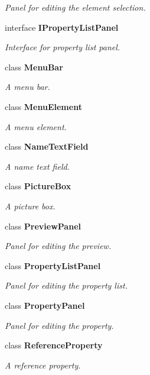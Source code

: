 \begin{DoxyCompactItemize}
\begin{DoxyCompactList}\small\item\em Panel for editing the element selection. \end{DoxyCompactList}\item 
interface {\bf I\-Property\-List\-Panel}
\begin{DoxyCompactList}\small\item\em Interface for property list panel. \end{DoxyCompactList}\item 
class {\bf Menu\-Bar}
\begin{DoxyCompactList}\small\item\em A menu bar. \end{DoxyCompactList}\item 
class {\bf Menu\-Element}
\begin{DoxyCompactList}\small\item\em A menu element. \end{DoxyCompactList}\item 
class {\bf Name\-Text\-Field}
\begin{DoxyCompactList}\small\item\em A name text field. \end{DoxyCompactList}\item 
class {\bf Picture\-Box}
\begin{DoxyCompactList}\small\item\em A picture box. \end{DoxyCompactList}\item 
class {\bf Preview\-Panel}
\begin{DoxyCompactList}\small\item\em Panel for editing the preview. \end{DoxyCompactList}\item 
class {\bf Property\-List\-Panel}
\begin{DoxyCompactList}\small\item\em Panel for editing the property list. \end{DoxyCompactList}\item 
class {\bf Property\-Panel}
\begin{DoxyCompactList}\small\item\em Panel for editing the property. \end{DoxyCompactList}\item 
class {\bf Reference\-Property}
\begin{DoxyCompactList}\small\item\em A reference property. \end{DoxyCompactList}\item 

\end{DoxyCompactItemize}
